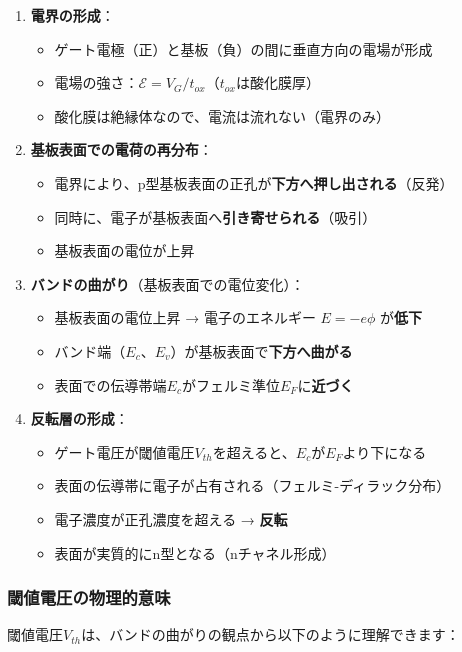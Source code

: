 \begin{enumerate}
\item \textbf{電界の形成}：
\begin{itemize}
\item ゲート電極（正）と基板（負）の間に垂直方向の電場が形成
\item 電場の強さ：$\mathcal{E} = V_G / t_{ox}$（$t_{ox}$は酸化膜厚）
\item 酸化膜は絶縁体なので、電流は流れない（電界のみ）
\end{itemize}

\item \textbf{基板表面での電荷の再分布}：
\begin{itemize}
\item 電界により、p型基板表面の正孔が\textbf{下方へ押し出される}（反発）
\item 同時に、電子が基板表面へ\textbf{引き寄せられる}（吸引）
\item 基板表面の電位が上昇
\end{itemize}

\item \textbf{バンドの曲がり}（基板表面での電位変化）：
\begin{itemize}
\item 基板表面の電位上昇 → 電子のエネルギー $E = -e\phi$ が\textbf{低下}
\item バンド端（$E_c$、$E_v$）が基板表面で\textbf{下方へ曲がる}
\item 表面での伝導帯端$E_c$がフェルミ準位$E_F$に\textbf{近づく}
\end{itemize}

\item \textbf{反転層の形成}：
\begin{itemize}
\item ゲート電圧が閾値電圧$V_{th}$を超えると、$E_c$が$E_F$より下になる
\item 表面の伝導帯に電子が占有される（フェルミ-ディラック分布）
\item 電子濃度が正孔濃度を超える → \textbf{反転}
\item 表面が実質的にn型となる（nチャネル形成）
\end{itemize}
\end{enumerate}

\subsubsection{閾値電圧の物理的意味}

閾値電圧$V_{th}$は、バンドの曲がりの観点から以下のように理解できます：

